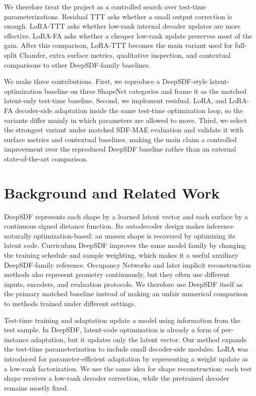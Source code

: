 \documentclass[letterpaper]{article}
\begin{document}
We therefore treat the project as a controlled search over test-time parameterizations. Residual TTT asks whether a small output correction is enough. LoRA-TTT asks whether low-rank internal decoder updates are more effective. LoRA-FA asks whether a cheaper low-rank update preserves most of the gain. After this comparison, LoRA-TTT becomes the main variant used for full-split Chamfer, extra surface metrics, qualitative inspection, and contextual comparisons to other DeepSDF-family baselines.

We make three contributions. First, we reproduce a DeepSDF-style latent-optimization baseline on three ShapeNet \cite{shapenet} categories and frame it as the matched latent-only test-time baseline. Second, we implement residual, LoRA, and LoRA-FA decoder-side adaptation inside the same test-time optimization loop, so the variants differ mainly in which parameters are allowed to move. Third, we select the strongest variant under matched SDF-MAE evaluation and validate it with surface metrics and contextual baselines, making the main claim a controlled improvement over the reproduced DeepSDF baseline rather than an external state-of-the-art comparison.

\section{Background and Related Work}

DeepSDF \cite{deepsdf} represents each shape by a learned latent vector and each surface by a continuous signed distance function. Its autodecoder design makes inference naturally optimization-based: an unseen shape is recovered by optimizing its latent code. Curriculum DeepSDF \cite{curriculum} improves the same model family by changing the training schedule and sample weighting, which makes it a useful auxiliary DeepSDF-family reference. Occupancy Networks \cite{occupancy} and later implicit reconstruction methods also represent geometry continuously, but they often use different inputs, encoders, and evaluation protocols. We therefore use DeepSDF itself as the primary matched baseline instead of making an unfair numerical comparison to methods trained under different settings.

Test-time training and adaptation \cite{ttt} update a model using information from the test sample. In DeepSDF, latent-code optimization is already a form of per-instance adaptation, but it updates only the latent vector. Our method expands the test-time parameterization to include small decoder-side modules. LoRA \cite{lora} was introduced for parameter-efficient adaptation by representing a weight update as a low-rank factorization. We use the same idea for shape reconstruction: each test shape receives a low-rank decoder correction, while the pretrained decoder remains mostly fixed.
\end{document}
